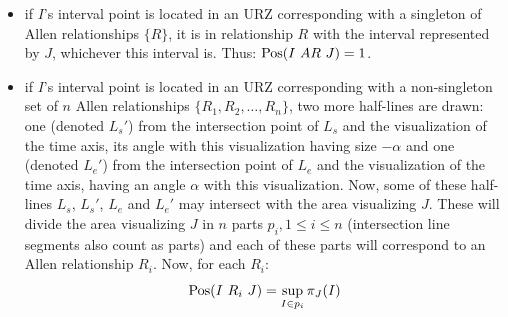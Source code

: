 \begin{itemize}
	\item if $I$'s interval point is located in an URZ corresponding with a singleton of Allen relationships $\{R\}$, it is in relationship $R$ with the interval represented by $J$, whichever this interval is. Thus: $\Pos(I\ AR\ J) = 1$.
	\item if $I$'s interval point is located in an URZ corresponding with a non-singleton set of $n$ Allen relationships $\{R_1, R_2, \ldots, R_n\}$, two more half-lines are drawn: one (denoted $L_s'$) from the intersection point of $L_s$ and the visualization of the time axis, its angle with this visualization having size $-\alpha$ and one (denoted $L_e'$) from the intersection point of $L_e$ and the visualization of the time axis, having an angle $\alpha$ with this visualization. Now, some of these half-lines $L_s$, $L_s'$, $L_e$ and $L_e'$ may intersect with the area visualizing $J$. These will divide the area visualizing $J$ in $n$ parts $p_i, 1 \leq i \leq n$ (intersection line segments also count as parts) and each of these parts will correspond to an Allen relationship $R_i$. Now, for each $R_i$:
	\begin{equation}
		\operatorname{Pos}(I\ R_i\ J) = \sup_{I \in p_i} \pi_J(I)
	\end{equation}
\end{itemize}




